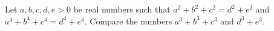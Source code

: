 \documentclass{article}
\begin{document}
\setlength{\parindent}{0pt}
Let $a,b,c,d,e>0$ be real numbers such that $a^{2}+b^{2}+c^{2}=d^{2}+e^{2}$ and $a^{4}+b^{4}+c^{4}=d^{4}+e^{4}$. Compare the numbers $a^{3}+b^{3}+c^{3}$ and $d^{3}+e^{3}$.
\end{document}
